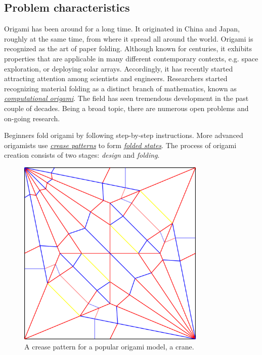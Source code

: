\subsection{Problem characteristics}
Origami has been around for a long time. It originated in China and Japan, roughly at the same time, from where it 
spread all around the world\cite{wiki:history-of-origami}. 
Origami is recognized as the art of paper folding.
Although known for centuries, it exhibits properties that are applicable 
in many different contemporary contexts, e.g.
space exploration\cite{origami-in-orbit}, or deploying solar arrays\cite{solar-panel-origami}.
Accordingly, it has recently started attracting attention among scientists and engineers.
Researchers started recognizing material folding as a distinct
branch of mathematics, known as \hyperref[dictionary:computational-origami]{\textit{computational origami}}.
The field has seen tremendous development in the past couple of decades.
Being a broad topic, there are numerous open problems \cite{mit-open-problems} and on-going research.

\medskip

Beginners fold origami by following step-by-step instructions.
More advanced origamists use \hyperref[dictionary:crease-pattern]{\textit{crease patterns}}
to form \hyperref[dictionary:folded-state]{\textit{folded states}}.
The process of origami creation consists of two stages: \textit{design} and \textit{folding}.

\begin{figure}[H]
\caption{A crease pattern for a popular origami model, a crane.}
  \centering
    \includegraphics[width=0.8\textwidth]{assets/crane-crease-pattern.png}
\end{figure}

